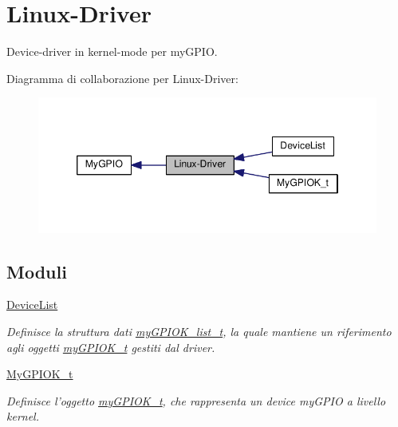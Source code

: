 \hypertarget{group___linux-_driver}{\section{Linux-\/\+Driver}
\label{group___linux-_driver}
}


Device-\/driver in kernel-\/mode per my\+G\+P\+I\+O.  


Diagramma di collaborazione per Linux-\/\+Driver\+:\nopagebreak
\begin{figure}[H]
\begin{center}
\leavevmode
\includegraphics[width=346pt]{group___linux-_driver}
\end{center}
\end{figure}
\subsection*{Moduli}
\begin{DoxyCompactItemize}
\item 
\hyperlink{group___device_list}{Device\+List}
\begin{DoxyCompactList}\small\item\em Definisce la struttura dati \hyperlink{structmy_g_p_i_o_k__list__t}{my\+G\+P\+I\+O\+K\+\_\+list\+\_\+t}, la quale mantiene un riferimento agli oggetti \hyperlink{structmy_g_p_i_o_k__t}{my\+G\+P\+I\+O\+K\+\_\+t} gestiti dal driver. \end{DoxyCompactList}\item 
\hyperlink{group__my_g_p_i_o_k__t}{My\+G\+P\+I\+O\+K\+\_\+t}
\begin{DoxyCompactList}\small\item\em Definisce l'oggetto \hyperlink{structmy_g_p_i_o_k__t}{my\+G\+P\+I\+O\+K\+\_\+t}, che rappresenta un device my\+G\+P\+I\+O a livello kernel. \end{DoxyCompactList}\end{DoxyCompactItemize}

